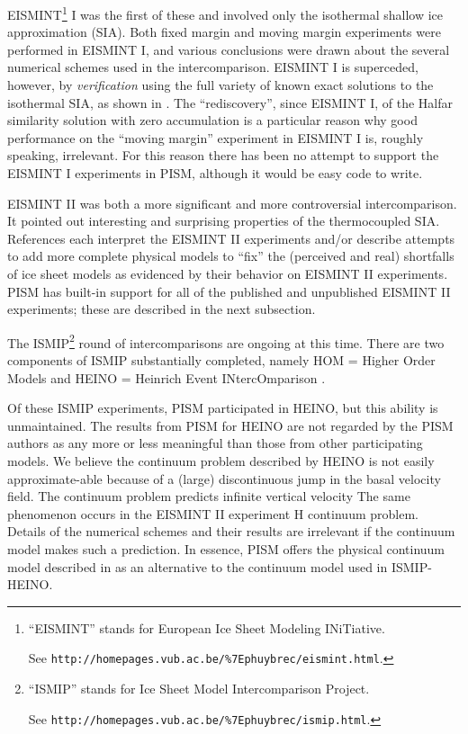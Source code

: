 \documentclass[11pt,final]{amsart}
\begin{document}
EISMINT\footnote{``EISMINT'' stands for European Ice Sheet Modeling INiTiative.  

See \texttt{http://homepages.vub.ac.be/\%7Ephuybrec/eismint.html}.} I \cite{EISMINT96} was the first of these and involved only the isothermal shallow ice approximation (SIA).  Both fixed margin and moving margin experiments were performed in EISMINT I, and various conclusions were drawn about the several numerical schemes used in the intercomparison.  EISMINT I is superceded, however, by \emph{verification} using the full variety of known exact solutions to the isothermal SIA, as shown in \cite{BLKCB}.  The ``rediscovery'', since EISMINT I, of the Halfar similarity solution with zero accumulation \cite{Halfar83} is a particular reason why good performance on the ``moving margin'' experiment in EISMINT I is, roughly speaking, irrelevant.  For this reason there has been no attempt to support the EISMINT I experiments in PISM, although it would be easy code to write.

EISMINT II \cite{EISMINT00} was both a more significant and more controversial intercomparison.  It pointed out interesting and surprising properties of the thermocoupled SIA.  References \cite{BBL,Hindmarsh04,Hindmarsh06,PayneBaldwin,SaitoEISMINT} each interpret the EISMINT II experiments and/or describe attempts to add more complete physical models to ``fix'' the (perceived and real) shortfalls of ice sheet models as evidenced by their behavior on EISMINT II experiments.  PISM has built-in support for all of the published and unpublished EISMINT II experiments; these are described in the next subsection.

The ISMIP\footnote{``ISMIP'' stands for Ice Sheet Model Intercomparison Project.  

See \texttt{http://homepages.vub.ac.be/\%7Ephuybrec/ismip.html}.} round of intercomparisons are ongoing at this time.  There are two components of ISMIP substantially completed, namely HOM = Higher Order Models \cite{HOMtcd,HOMelmer} and HEINO = Heinrich Event INtercOmparison \cite{GreveTakahamaCalov}.

Of these ISMIP experiments, PISM participated in HEINO, but this ability is unmaintained.  The results from PISM for HEINO are not regarded by the PISM authors as any more or less meaningful than those from other participating models.   We believe the continuum problem described by HEINO is not easily approximate-able because of a (large) discontinuous jump in the basal velocity field.  The continuum problem predicts infinite vertical velocity \cite[Appendix B]{BBssasliding}  The same phenomenon occurs in the EISMINT II experiment H continuum problem.  Details of the numerical schemes and their results are irrelevant if the continuum model makes such a prediction.  In essence, PISM offers the physical continuum model described in \cite{BBssasliding} as an alternative to the continuum model used in ISMIP-HEINO.
\end{document}
